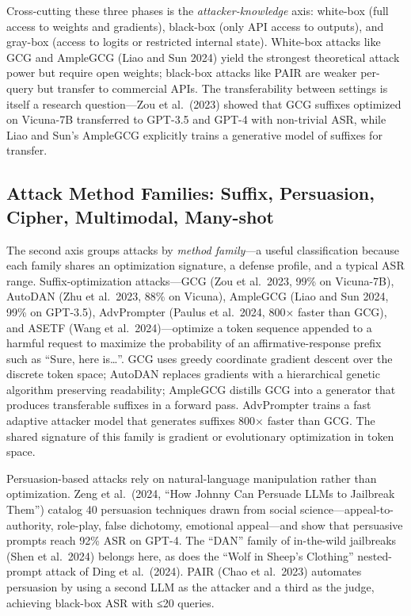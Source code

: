 Cross-cutting these three phases is the \emph{attacker-knowledge} axis: white-box (full access to weights and gradients), black-box (only API access to outputs), and gray-box (access to logits or restricted internal state). White-box attacks like GCG and AmpleGCG (Liao and Sun 2024) yield the strongest theoretical attack power but require open weights; black-box attacks like PAIR are weaker per-query but transfer to commercial APIs. The transferability between settings is itself a research question---Zou et al.~(2023) showed that GCG suffixes optimized on Vicuna-7B transferred to GPT-3.5 and GPT-4 with non-trivial ASR, while Liao and Sun's AmpleGCG explicitly trains a generative model of suffixes for transfer.

\subsection{Attack Method Families: Suffix, Persuasion, Cipher, Multimodal, Many-shot}\label{attack-method-families-suffix-persuasion-cipher-multimodal-many-shot}

The second axis groups attacks by \emph{method family}---a useful classification because each family shares an optimization signature, a defense profile, and a typical ASR range. Suffix-optimization attacks---GCG (Zou et al.~2023, 99\% on Vicuna-7B), AutoDAN (Zhu et al.~2023, 88\% on Vicuna), AmpleGCG (Liao and Sun 2024, 99\% on GPT-3.5), AdvPrompter (Paulus et al.~2024, 800× faster than GCG), and ASETF (Wang et al.~2024)---optimize a token sequence appended to a harmful request to maximize the probability of an affirmative-response prefix such as ``Sure, here is\ldots{}''. GCG uses greedy coordinate gradient descent over the discrete token space; AutoDAN replaces gradients with a hierarchical genetic algorithm preserving readability; AmpleGCG distills GCG into a generator that produces transferable suffixes in a forward pass. AdvPrompter trains a fast adaptive attacker model that generates suffixes 800× faster than GCG. The shared signature of this family is gradient or evolutionary optimization in token space.

Persuasion-based attacks rely on natural-language manipulation rather than optimization. Zeng et al.~(2024, ``How Johnny Can Persuade LLMs to Jailbreak Them'') catalog 40 persuasion techniques drawn from social science---appeal-to-authority, role-play, false dichotomy, emotional appeal---and show that persuasive prompts reach 92\% ASR on GPT-4. The ``DAN'' family of in-the-wild jailbreaks (Shen et al.~2024) belongs here, as does the ``Wolf in Sheep's Clothing'' nested-prompt attack of Ding et al.~(2024). PAIR (Chao et al.~2023) automates persuasion by using a second LLM as the attacker and a third as the judge, achieving black-box ASR with ≤20 queries.

